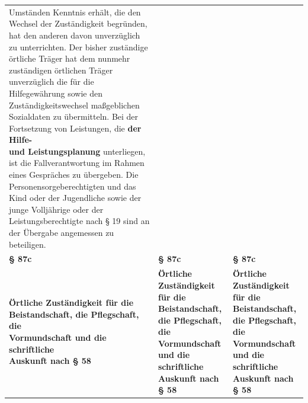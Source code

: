 \documentclass[10pt,a4paper,landscape]{article}
\begin{document}
\begin{longtable}{|L{8.2cm}|L{8.2cm}|L{8.2cm}|}
\newline Umständen Kenntnis erhält, die den  \newline Wechsel der Zuständigkeit begründen, hat  \newline den anderen davon unverzüglich zu  \newline unterrichten. Der bisher zuständige örtliche  \newline Träger hat dem nunmehr zuständigen  \newline örtlichen Träger unverzüglich die für die  \newline Hilfegewährung sowie den  \newline Zuständigkeitswechsel maßgeblichen  \newline Sozialdaten zu übermitteln. Bei der  \newline Fortsetzung von Leistungen, die \textbf{der Hilfe-  \newline und Leistungsplanung} unterliegen, ist die  \newline Fallverantwortung im Rahmen eines  \newline Gespräches zu übergeben. Die  \newline Personensorgeberechtigten und das Kind  \newline oder der Jugendliche sowie der junge  \newline Volljährige oder der Leistungsberechtigte  \newline nach \S{} 19 sind an der Übergabe  \newline angemessen zu beteiligen. \\
\hhline{|---|}
\textbf{\S{} 87c} & \textbf{\S{} 87c} & \textbf{\S{} 87c} \\
\hhline{|---|}
\textbf{Örtliche Zuständigkeit für die  \newline Beistandschaft, die Pflegschaft, die  \newline Vormundschaft und die schriftliche  \newline Auskunft nach \S{} 58} & \textbf{Örtliche Zuständigkeit für die  \newline Beistandschaft, die Pflegschaft, die  \newline Vormundschaft und die schriftliche  \newline Auskunft nach \S{} 58} & \textbf{Örtliche Zuständigkeit für die  \newline Beistandschaft, die Pflegschaft, die  \newline Vormundschaft und die schriftliche  \newline Auskunft nach \S{} 58} \\

\end{longtable}
\end{document}
